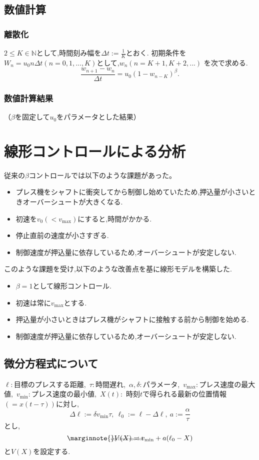 \documentclass [dvipdfmx] {jsarticle}
\makeatletter
\let\temp@label\label
\def\label#1{\marginnote{\hbox to 0pt{\scriptsize \textcolor{black!60}{#1}\hss}}\temp@label{#1}\ignorespaces}
\numberwithin{equation}{section}
\theoremstyle{definition} %
\theoremstyle{definition} %
\makeatother
\begin{document}
\subsection{数値計算}
\subsubsection{離散化}
$2\le K\in\mathbb{N}$として,時間刻み幅を$\Delta t:=\frac{1}{K}$とおく.
初期条件を$W_n=u_0n\Delta t (n=0,1,...,K)$として,$w_n(n=K+1,K+2,...)$
を次で求める.
\begin{equation}
    \displaystyle\frac{w_{n+1}-w_n}{\Delta t}=u_0(1-w_{n-K})^\beta.
\end{equation}

\subsubsection{数値計算結果}
（$\beta$を固定して$u_0$をパラメータとした結果）
\section{線形コントロールによる分析}
従来の$\beta$コントロールでは以下のような課題があった。
\begin{itemize}
    \item プレス機をシャフトに衝突してから制御し始めていたため,押込量が小さいときオーバーシュートが大きくなる.
    \item 初速を$v_0(<v_{\max})$にすると,時間がかかる.
    \item 停止直前の速度が小さすぎる.
    \item 制御速度が押込量に依存しているため,オーバーシュートが安定しない.
\end{itemize}
このような課題を受け,以下のような改善点を基に線形モデルを構築した.
\begin{itemize}
    \item $\beta=1$として線形コントロール. 
    \item 初速は常に$v_{\max}$とする.
    \item 押込量が小さいときはプレス機がシャフトに接触する前から制御を始める.
    \item 制御速度が押込量に依存しているため,オーバーシュートが安定しない.
\end{itemize}
\subsection{微分方程式について}
$\ell:$目標のプレスする距離,\ $\tau:$時間遅れ,\ $\alpha,\delta:$パラメータ,\ 
$v_{\max}:$プレス速度の最大値,\ $v_{\min}:$プレス速度の最小値,\ $X(t):$
時刻$t$で得られる最新の位置情報$(=x(t-\tau))$に対し,
\begin{equation}
    \Delta\ell :=\delta v_{\min}\tau,\ \ell_0:=\ell-\Delta\ell,\ a:=\frac{\alpha}{\tau}
\end{equation}
とし,
\begin{equation}\label{eq:linermodel}
    V(X)=v_{\min}+a(\ell_0-X)
\end{equation}
と$V(X)$を設定する.
\end{document}
